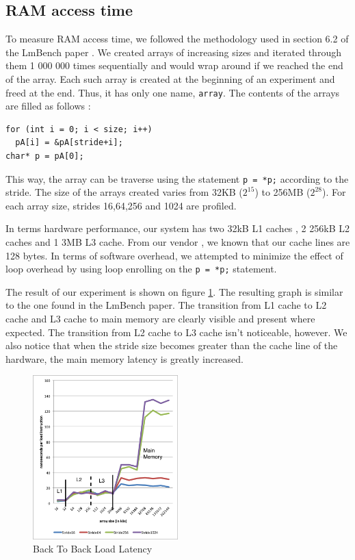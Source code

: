 \subsection{RAM access time}

To measure RAM access time, we followed the methodology used in section 6.2 of the LmBench paper \cite{lmbench}. We created arrays of increasing sizes and iterated through them 1 000 000 times sequentially and would wrap around if we reached the end of the array. Each such array is created at the beginning of an experiment and freed at the end. Thus, it has only one name, \texttt{array}. The contents of the arrays are filled as follows :

\begin{lstlisting}
for (int i = 0; i < size; i++)
  pA[i] = &pA[stride+i];
char* p = pA[0];
\end{lstlisting}

This way, the array can be traverse using the statement \texttt{p = *p;} according to the stride. The size of the arrays created varies from 32KB ($2^{15}$) to 256MB ($2^{28}$). For each array size, strides 16,64,256 and 1024 are profiled. 

In terms hardware performance, our system has two 32kB L1 caches , 2 256kB L2 caches and 1 3MB L3 cache. From our vendor \cite{vendor}, we known that our cache lines are 128 bytes. In terms of software overhead, we attempted to minimize the effect of loop overhead by using loop enrolling on the \texttt{p = *p;} statement.

The result of our experiment is shown on figure \ref{fig:b2blatency}. The resulting graph is similar to the one found in the LmBench paper. The transition from L1 cache to L2 cache and L3 cache to main memory are clearly visible and present where expected. The transition from L2 cache to L3 cache isn't noticeable, however. We also notice that when the stride size becomes greater than the cache line of the hardware, the main memory latency is greatly increased.

\begin{figure}
 \centering
  \includegraphics[width=0.5\textwidth]{image/backtobackload2.png}
  \caption{Back To Back Load Latency}
 \label{fig:b2blatency}
\end{figure}

